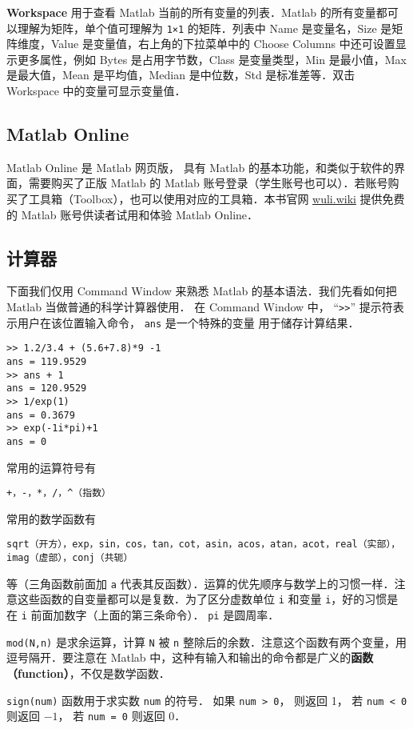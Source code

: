 \textbf{Workspace} 用于查看 Matlab 当前的所有变量的列表．Matlab 的所有变量都可以理解为矩阵，单个值可理解为 \verb|1×1| 的矩阵．列表中 Name 是变量名，Size 是矩阵维度，Value 是变量值，右上角的下拉菜单中的 Choose Columns 中还可设置显示更多属性，例如 Bytes 是占用字节数，Class 是变量类型，Min 是最小值，Max 是最大值，Mean 是平均值，Median 是中位数，Std 是标准差等．双击 Workspace 中的变量可显示变量值．

\subsection{Matlab Online}
Matlab Online 是 Matlab 网页版， 具有 Matlab 的基本功能，和类似于软件的界面，需要购买了正版 Matlab 的 Matlab 账号登录（学生账号也可以）．若账号购买了工具箱（Toolbox），也可以使用对应的工具箱．本书官网 \href{https://wuli.wiki}{wuli.wiki} 提供免费的 Matlab 账号供读者试用和体验 Matlab Online．

\subsection{计算器}
下面我们仅用 Command Window 来熟悉 Matlab 的基本语法．我们先看如何把 Matlab 当做普通的科学计算器使用． 在 Command Window 中， “\verb|>>|” 提示符表示用户在该位置输入命令， \verb|ans| 是一个特殊的变量 用于储存计算结果．
\begin{lstlisting}[language=matlabC]
>> 1.2/3.4 + (5.6+7.8)*9 -1
ans = 119.9529
>> ans + 1
ans = 120.9529
>> 1/exp(1)
ans = 0.3679
>> exp(-1i*pi)+1
ans = 0
\end{lstlisting}
常用的运算符号有
\begin{lstlisting}[language=matlabC]
+，-，*，/，^（指数）
\end{lstlisting}
常用的数学函数有
\begin{lstlisting}[language=matlabC]
sqrt（开方），exp，sin，cos，tan，cot，asin，acos，atan，acot，real（实部），imag（虚部），conj（共轭）
\end{lstlisting}
等（三角函数前面加 \verb|a| 代表其反函数）．运算的优先顺序与数学上的习惯一样．注意这些函数的自变量都可以是复数．为了区分虚数单位 \verb|i| 和变量 \verb|i|，好的习惯是在 \verb|i| 前面加数字（上面的第三条命令）． \verb|pi| 是圆周率．

\verb|mod(N,n)| 是求余运算，计算 \verb|N| 被 \verb|n| 整除后的余数．注意这个函数有两个变量，用逗号隔开．要注意在 Matlab 中，这种有输入和输出的命令都是广义的\textbf{函数（function）}，不仅是数学函数．

\verb|sign(num)| 函数用于求实数 \verb|num| 的符号． 如果 \verb|num > 0|， 则返回 1， 若 \verb|num < 0| 则返回 $-1$， 若 \verb|num = 0| 则返回 0．

